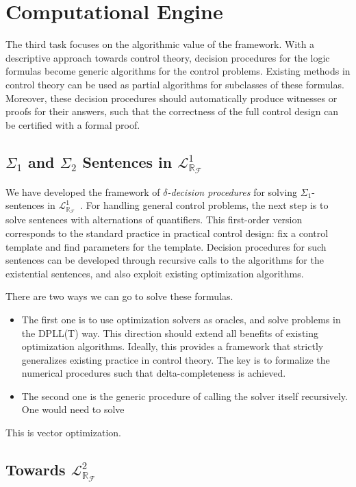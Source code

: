 \documentclass[10pt]{article}
\newcommand{\lrf}{\mathcal{L}_{\mathbb{R}_{\mathcal{F}}}}
\theoremstyle{definition}
\begin{document}
\section{Computational Engine}


The third task focuses on the algorithmic value of the framework. With a descriptive approach towards control theory, decision procedures for the logic formulas become generic algorithms for the control problems. Existing methods in control theory can be used as partial algorithms for subclasses of these formulas. Moreover, these decision procedures should automatically produce witnesses or proofs for their answers, such that the correctness of the full control design can be certified with a formal proof.

\subsection{$\Sigma_1$ and $\Sigma_2$ Sentences in $\lrf^1$} 

We have developed the framework of {\em $\delta$-decision procedures} for solving $\Sigma_1$-sentences in $\lrf^1$~\cite{DBLP:conf/cade/GaoAC12}. For handling general control problems, the next step is to solve sentences with alternations of quantifiers. This first-order version corresponds to the standard practice in practical control design: fix a control template and find parameters for the template. Decision procedures for such sentences can be developed through recursive calls to the algorithms for the existential sentences, and also exploit existing optimization algorithms. 

There are two ways we can go to solve these formulas. 
\begin{itemize}
\item The first one is to use optimization solvers as oracles, and solve problems in the DPLL(T) way. This direction should extend all benefits of existing optimization algorithms. Ideally, this provides a framework that strictly generalizes existing practice in control theory. The key is to formalize the numerical procedures such that delta-completeness is achieved. 
\item The second one is the generic procedure of calling the solver itself recursively. One would need to solve 
\end{itemize}

This is vector optimization.  

\subsection{Towards $\lrf^2$} 
\end{document}
